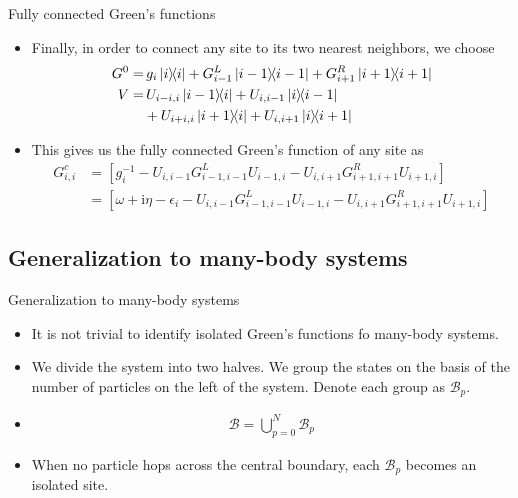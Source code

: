 \documentclass[usenames,dvipsnames]{beamer}
\newcommand{\I}{\mathrm{i}}
\begin{document}
\begin{frame}{Fully connected Green's functions}
	\begin{itemize}
		\item {Finally, in order to connect any site to its two nearest neighbors, we choose
		\begin{align}
		G^{0} =&\,g_{i}\ketbra{i}{i} + G^{L}_{i-1}\ketbra{i-1}{i-1} + G^{R}_{i+1}\ketbra{i+1}{i+1}\\
		\nonumber V =&\,U_{i-i,i}\ketbra{i-1}{i} + U_{i,i-1}\ketbra{i}{i-1} \\&+ U_{i+i,i}\ketbra{i+1}{i} + U_{i,i+1}\ketbra{i}{i+1}
		\end{align}}
		\item {This gives us the fully connected Green's function of any site as
		\begin{align}
		\nonumber G^{c}_{i,i} &= \left[ g^{-1}_{i} - U_{i,i-1} G^{L}_{i-1, i-1} U_{i-1,i} - U_{i,i+1} G^{R}_{i+1,i+1} U_{i+1,i} \right]\\
		&= \left[ \omega + \I \eta -\epsilon_i - U_{i,i-1} G^{L}_{i-1, i-1} U_{i-1,i} - U_{i,i+1} G^{R}_{i+1,i+1} U_{i+1,i} \right]
		\end{align}}
	\end{itemize}
\end{frame}

\subsection{Generalization to many-body systems}
\begin{frame}{Generalization to many-body systems}
	\begin{itemize}
		\item {
		It is not trivial to identify isolated Green's functions fo many-body systems.
		}
	\item {
		We divide the system into two halves. We group the states on the basis of the number of particles on the left of the system. Denote each group as $ \mathcal{B}_p $. 
		}
	\item{
		\begin{align}
		\mathcal{B} = \bigcup_{p = 0}^{N} \mathcal{B}_p
		\end{align}
		}
	\item {
		When no particle hops across the central boundary, each $ \mathcal{B}_p $ becomes an isolated site.
		}
	\end{itemize}
\end{frame}
\end{document}
